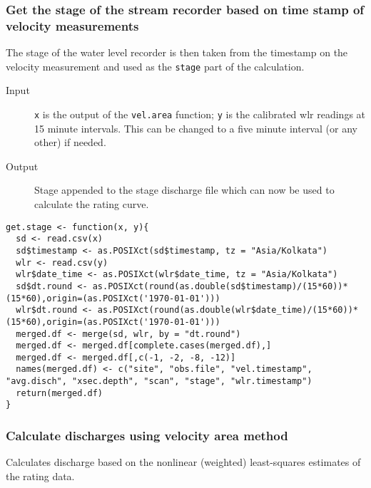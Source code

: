 \documentclass[a4paper]{article}
\begin{document}
\subsubsection*{Get the stage of the stream recorder based on time stamp of velocity measurements}
\label{sec:org979aa31}

The stage of the water level recorder is then taken from the timestamp on the velocity measurement and used as the \texttt{stage} part of the calculation. 

\begin{description}
\item[{Input}] \texttt{x} is the output of the \texttt{vel.area} function; \texttt{y} is the calibrated wlr readings at 15 minute intervals. This can be changed to a five minute interval (or any other) if needed.
\item[{Output}] Stage appended to the stage discharge file which can now be used to calculate the rating curve.
\end{description}

\begin{verbatim}
get.stage <- function(x, y){
  sd <- read.csv(x)
  sd$timestamp <- as.POSIXct(sd$timestamp, tz = "Asia/Kolkata")
  wlr <- read.csv(y)
  wlr$date_time <- as.POSIXct(wlr$date_time, tz = "Asia/Kolkata")
  sd$dt.round <- as.POSIXct(round(as.double(sd$timestamp)/(15*60))*(15*60),origin=(as.POSIXct('1970-01-01')))
  wlr$dt.round <- as.POSIXct(round(as.double(wlr$date_time)/(15*60))*(15*60),origin=(as.POSIXct('1970-01-01')))
  merged.df <- merge(sd, wlr, by = "dt.round")
  merged.df <- merged.df[complete.cases(merged.df),]
  merged.df <- merged.df[,c(-1, -2, -8, -12)]
  names(merged.df) <- c("site", "obs.file", "vel.timestamp", "avg.disch", "xsec.depth", "scan", "stage", "wlr.timestamp")
  return(merged.df)
}
\end{verbatim}

\subsubsection*{Calculate discharges using velocity area method}
\label{sec:orgf03fe88}

Calculates discharge based on the nonlinear (weighted) least-squares estimates of the rating data.
\end{document}
